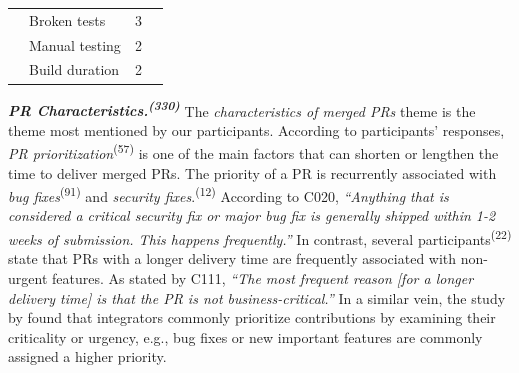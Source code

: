 \begin{table}
\begin{tabular}{clcc}
		\cline{2-3}          & Broken tests & 3     &  \bigstrut\\
		\cline{2-3}          & Manual testing & 2     &  \bigstrut\\
		\cline{2-3}          & Build duration & 2     &  \bigstrut\\
		\hline
	\end{tabular}%
	\label{tab:general_factors_impact_ci}%
\end{table}%

\vspace{0.6mm}
\noindent\textit{\textbf{PR Characteristics.\textsuperscript{(330)}}} The {\em characteristics of merged PRs} theme is the theme most mentioned by our participants. According to participants' responses, \textit{PR prioritization}\textsuperscript{(57)} is one of the main factors that can shorten or lengthen the time to deliver merged PRs. The priority of a PR is recurrently associated with \textit{bug fixes}\textsuperscript{(91)} and \textit{security fixes}.\textsuperscript{(12)} According to C020, \textit{``Anything that is considered a critical security fix or major bug fix is generally shipped within 1-2 weeks of submission. This happens frequently.''} In contrast, several participants\textsuperscript{(22)} state that PRs with a longer delivery time are frequently associated with non-urgent features. As stated by C111, \textit{``The most frequent reason [for a longer delivery time] is that the PR is not business-critical.''} In a similar vein, the study by \cite{gousios2015work} found that integrators commonly prioritize contributions by examining their criticality or urgency, e.g., bug fixes or new important features are commonly assigned a higher priority. 

